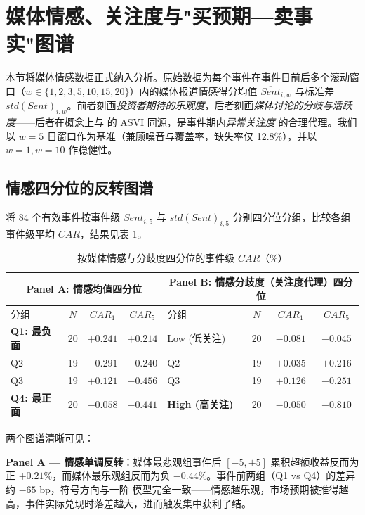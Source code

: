 \documentclass[11pt]{ctexart}
\begin{document}
\section{媒体情感、关注度与"买预期—卖事实"图谱}
\label{sec:sentiment}

本节将媒体情感数据正式纳入分析。原始数据为每个事件在事件日前后多个滚动窗口（$w\in\{1,2,3,5,10,15,20\}$）内的媒体报道情感得分均值 $\overline{Sent}_{i,w}$ 与标准差 $std(Sent)_{i,w}$。前者刻画\emph{投资者期待的乐观度}，后者刻画\emph{媒体讨论的分歧与活跃度}——后者在概念上与 \cite{DaEngelbergGao2011} 的 ASVI 同源，是事件期内\emph{异常关注度} 的合理代理。我们以 $w=5$ 日窗口作为基准（兼顾噪音与覆盖率，缺失率仅 12.8\%），并以 $w=1, w=10$ 作稳健性。

\subsection{情感四分位的反转图谱}

将 84 个有效事件按事件级 $\overline{Sent}_{i,5}$ 与 $std(Sent)_{i,5}$ 分别四分位分组，比较各组事件级平均 $CAR$，结果见表 \ref{tab:sent_q}。

\begin{table}[htbp]
\centering
\caption{按媒体情感与分歧度四分位的事件级 $\overline{CAR}$（\%）}
\label{tab:sent_q}
\small
\begin{tabular}{lccc|lccc}
\toprule
\multicolumn{4}{c|}{Panel A: 情感均值四分位} & \multicolumn{4}{c}{Panel B: 情感分歧度（关注度代理）四分位} \\
\midrule
分组 & $N$ & $CAR_{1}$ & $CAR_{5}$ & 分组 & $N$ & $CAR_{1}$ & $CAR_{5}$ \\
\midrule
\textbf{Q1: 最负面}    & 20 & $\mathbf{+0.241}$ & $\mathbf{+0.214}$ & Low (低关注)  & 20 & $-0.081$ & $-0.045$ \\
Q2                  & 19 & $-0.291$ & $-0.240$ & Q2          & 19 & $+0.035$ & $+0.216$ \\
Q3                  & 19 & $+0.121$ & $-0.456$ & Q3          & 19 & $+0.126$ & $-0.251$ \\
\textbf{Q4: 最正面}    & 20 & $-0.058$ & $\mathbf{-0.441}$ & \textbf{High (高关注)} & 20 & $-0.050$ & $\mathbf{-0.810}$ \\
\bottomrule
\end{tabular}
\end{table}

两个图谱清晰可见：

\textbf{Panel A — 情感单调反转}：媒体最悲观组事件后 $[-5,+5]$ 累积超额收益反而为正 $+0.21\%$，而媒体最乐观组反而为负 $-0.44\%$。事件前两组（Q1 vs Q4）的差异约 $-65$ bp，符号方向与一阶 \cite{DaEngelbergGao2011} 模型完全一致——情感越乐观，市场预期被推得越高，事件实际兑现时落差越大，进而触发集中获利了结。
\end{document}

